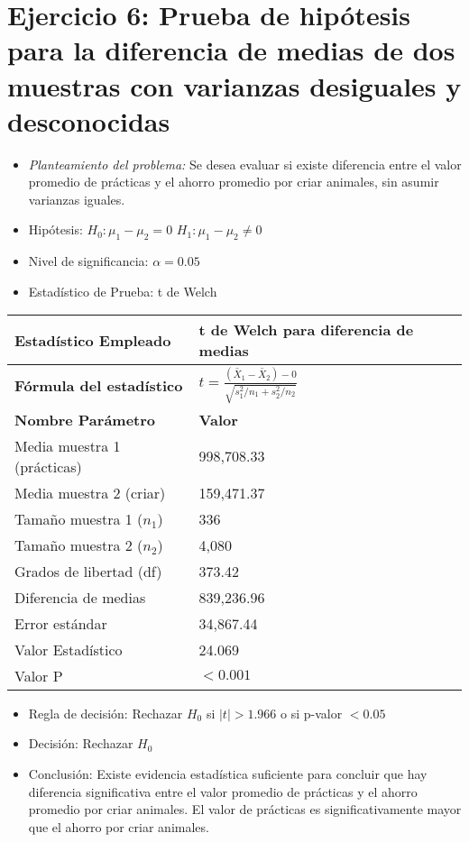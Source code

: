 \documentclass[12pt,a4paper]{article}
\begin{document}
\section*{Ejercicio 6: Prueba de hipótesis para la diferencia de medias de dos muestras con varianzas desiguales y desconocidas}
\begin{itemize}
    \item \textit{Planteamiento del problema:} Se desea evaluar si existe diferencia entre el valor promedio de prácticas y el ahorro promedio por criar animales, sin asumir varianzas iguales.
    \item Hipótesis: \quad $H_{0}: \mu_1 - \mu_2 = 0$ \hspace{2cm} $H_{1}: \mu_1 - \mu_2 \neq 0$
    \item Nivel de significancia: $\alpha = 0.05$
    \item Estadístico de Prueba: t de Welch
\end{itemize}

\begin{tabular}{|m{7cm}|m{7cm}|}
\hline
\textbf{Estadístico Empleado} & t de Welch para diferencia de medias \\ \hline
\textbf{Fórmula del estadístico} & $t = \frac{(\bar{X}_1 - \bar{X}_2) - 0}{\sqrt{s_1^2/n_1 + s_2^2/n_2}}$ \\ \hline
\textbf{Nombre Parámetro} & \textbf{Valor} \\ \hline
Media muestra 1 (prácticas) & 998,708.33 \\ \hline
Media muestra 2 (criar) & 159,471.37 \\ \hline
Tamaño muestra 1 ($n_1$) & 336 \\ \hline
Tamaño muestra 2 ($n_2$) & 4,080 \\ \hline
Grados de libertad (df) & 373.42 \\ \hline
Diferencia de medias & 839,236.96 \\ \hline
Error estándar & 34,867.44 \\ \hline
Valor Estadístico & 24.069 \\ \hline
Valor P & $< 0.001$ \\ \hline
\end{tabular}

\begin{itemize}
    \item Regla de decisión: Rechazar $H_0$ si $|t| > 1.966$ o si p-valor $< 0.05$
    \item Decisión: Rechazar $H_0$
    \item Conclusión: Existe evidencia estadística suficiente para concluir que hay diferencia significativa entre el valor promedio de prácticas y el ahorro promedio por criar animales. El valor de prácticas es significativamente mayor que el ahorro por criar animales.
\end{itemize}
\end{document}
